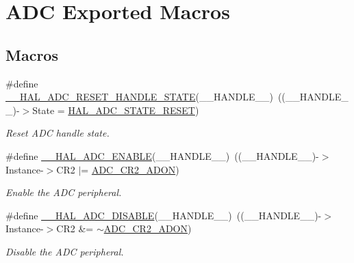 \hypertarget{group___a_d_c___exported___macros}{}\section{A\+DC Exported Macros}
\label{group___a_d_c___exported___macros}
\subsection*{Macros}
\begin{DoxyCompactItemize}
\item 
\#define \mbox{\hyperlink{group___a_d_c___exported___macros_gacb290bae25b972942021331122a3600f}{\+\_\+\+\_\+\+H\+A\+L\+\_\+\+A\+D\+C\+\_\+\+R\+E\+S\+E\+T\+\_\+\+H\+A\+N\+D\+L\+E\+\_\+\+S\+T\+A\+TE}}(\+\_\+\+\_\+\+H\+A\+N\+D\+L\+E\+\_\+\+\_\+)~((\+\_\+\+\_\+\+H\+A\+N\+D\+L\+E\+\_\+\+\_\+)-\/$>$State = \mbox{\hyperlink{group___a_d_c___exported___types_ga3f995b6dedd7366d0663f852511b9104}{H\+A\+L\+\_\+\+A\+D\+C\+\_\+\+S\+T\+A\+T\+E\+\_\+\+R\+E\+S\+ET}})
\begin{DoxyCompactList}\small\item\em Reset A\+DC handle state. \end{DoxyCompactList}\item 
\#define \mbox{\hyperlink{group___a_d_c___exported___macros_gaadf16862da7593def189559423c287f4}{\+\_\+\+\_\+\+H\+A\+L\+\_\+\+A\+D\+C\+\_\+\+E\+N\+A\+B\+LE}}(\+\_\+\+\_\+\+H\+A\+N\+D\+L\+E\+\_\+\+\_\+)~((\+\_\+\+\_\+\+H\+A\+N\+D\+L\+E\+\_\+\+\_\+)-\/$>$Instance-\/$>$C\+R2 $\vert$=  \mbox{\hyperlink{group___peripheral___registers___bits___definition_ga89b646f092b052d8488d2016f6290f0e}{A\+D\+C\+\_\+\+C\+R2\+\_\+\+A\+D\+ON}})
\begin{DoxyCompactList}\small\item\em Enable the A\+DC peripheral. \end{DoxyCompactList}\item 
\#define \mbox{\hyperlink{group___a_d_c___exported___macros_ga8afd5963c41c0a30c5cf1fec5c5710b3}{\+\_\+\+\_\+\+H\+A\+L\+\_\+\+A\+D\+C\+\_\+\+D\+I\+S\+A\+B\+LE}}(\+\_\+\+\_\+\+H\+A\+N\+D\+L\+E\+\_\+\+\_\+)~((\+\_\+\+\_\+\+H\+A\+N\+D\+L\+E\+\_\+\+\_\+)-\/$>$Instance-\/$>$C\+R2 \&=  $\sim$\mbox{\hyperlink{group___peripheral___registers___bits___definition_ga89b646f092b052d8488d2016f6290f0e}{A\+D\+C\+\_\+\+C\+R2\+\_\+\+A\+D\+ON}})
\begin{DoxyCompactList}\small\item\em Disable the A\+DC peripheral. \end{DoxyCompactList}\item 

\end{DoxyCompactItemize}
